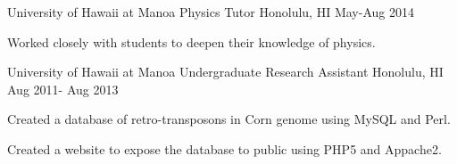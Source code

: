 \begin{cventries}
     \cventry
    {University of Hawaii at Manoa}
    {Physics Tutor}
    {Honolulu, HI}
    {May-Aug 2014}
    {
      \begin{cvitems}
        \item {Worked closely with students to deepen their knowledge of physics.}
      \end{cvitems}
    }
     \cventry
         {University of Hawaii at Manoa}
         {Undergraduate Research Assistant}
         {Honolulu, HI}
         {Aug 2011- Aug 2013}
         {
         	\begin{cvitems}
         		\item {Created a database of retro-transposons in Corn genome using MySQL and Perl.}
         		\item {Created a website to expose the database to public using PHP5 and Appache2.}
         	\end{cvitems}
         }
         
\end{cventries}
